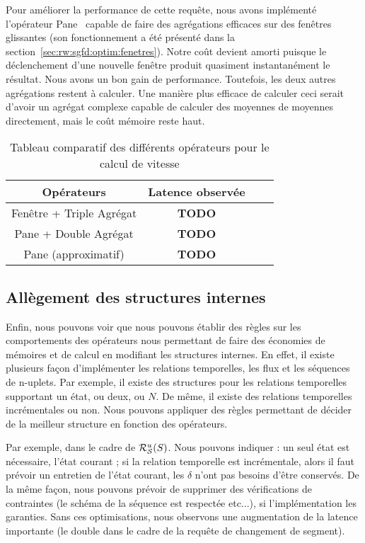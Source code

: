 Pour améliorer la performance de cette requête, nous avons implémenté l'opérateur Pane~\cite{Li:pane} capable de faire des agrégations efficaces sur des fenêtres glissantes (son fonctionnement a été présenté dans la section~\ref{sec:rw:sgfd:optim:fenetres}). Notre coût devient amorti puisque le déclenchement d'une nouvelle fenêtre produit quasiment instantanément le résultat. Nous avons un bon gain de performance. Toutefois, les deux autres agrégations restent à calculer. Une manière plus efficace de calculer ceci serait d'avoir un agrégat complexe capable de calculer des moyennes de moyennes directement, mais le coût mémoire reste haut.

\begin{table}[ht]
\centering
\begin{tabular}{|c|c|c|c|}\bottomrule
\rowcolor{hypcolor} Opérateurs & Latence observée \\ \hline
Fenêtre + Triple Agrégat & \textbf{TODO}\\\hline
Pane + Double Agrégat & \textbf{TODO} \\\hline
Pane (approximatif) & \textbf{TODO} \\ \toprule
\end{tabular}
\caption{Tableau comparatif des différents opérateurs pour le calcul de vitesse}
\end{table}

\subsection{Allègement des structures internes}
Enfin, nous pouvons voir que nous pouvons établir des règles sur les comportements des opérateurs nous permettant de faire des économies de mémoires et de calcul en modifiant les structures internes. En effet, il existe plusieurs façon d'implémenter les relations temporelles, les flux et les séquences de n-uplets. Par exemple, il existe des structures pour les relations temporelles supportant un état, ou deux, ou $N$. De même, il existe des relations temporelles incrémentales ou non. Nous pouvons appliquer des règles permettant de décider de la meilleur structure en fonction des opérateurs.

Par exemple, dans le cadre de $\mathcal{R}_{\mathcal S}^{u}(S)$. Nous pouvons indiquer : un seul état est nécessaire, l'état courant ; si la relation temporelle est incrémentale, alors il faut prévoir un entretien de l'état courant, les $\delta$ n'ont pas besoins d'être conservés. De la même façon, nous pouvons prévoir de supprimer des vérifications de contraintes (le schéma de la séquence est respectée etc...), si l'implémentation les garanties. Sans ces optimisations, nous observons une augmentation de la latence importante (le double dans le cadre de la requête de changement de segment).

